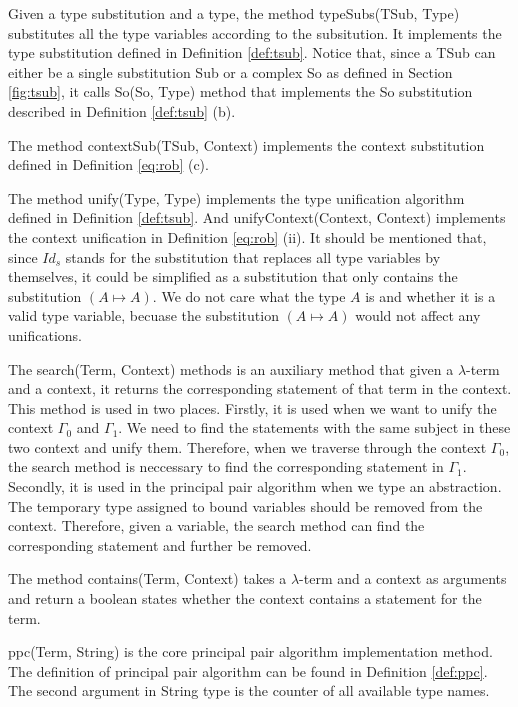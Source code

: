 Given a type substitution and a type, the method \textsf{typeSubs(TSub, Type)} substitutes all the type variables according to the subsitution. It implements the type substitution defined in Definition \ref{def:tsub}. Notice that, since a \textsf{TSub} can either be a single substitution \textsf{Sub} or a complex \textsf{So} as defined in Section \ref{fig:tsub}, it calls \textsf{So(So, Type)} method that implements the \textsf{So} substitution described in Definition \ref{def:tsub} (b). 

The method \textsf{contextSub(TSub, Context)} implements the context substitution defined in Definition \ref{eq:rob} (c). 

The method \textsf{unify(Type, Type)} implements the type unification algorithm defined in Definition \ref{def:tsub}. And \textsf{unifyContext(Context, Context)} implements the context unification in Definition \ref{eq:rob} (ii). It should be mentioned that, since $Id_s$ stands for the substitution that replaces all type variables by themselves, it could be simplified as a substitution that only contains the substitution $(A\mapsto A)$. We do not care what the type $A$ is and whether it is a valid type variable, becuase the substitution $(A\mapsto A)$ would not affect any unifications. 

The \textsf{search(Term, Context)} methods is an auxiliary method that given a $\lambda$-term and a context, it returns the corresponding statement of that term in the context. This method is used in two places. Firstly, it is used when we want to unify the context $\Gamma_0$ and $\Gamma_1$. We need to find the statements with the same subject in these two context and unify them. Therefore, when we traverse through the context $\Gamma_0$, the search method is neccessary to find the corresponding statement in $\Gamma_1$. Secondly, it is used in the principal pair algorithm when we type an abstraction. The temporary type assigned to bound variables should be removed from the context. Therefore, given a variable, the search method can find the corresponding statement and further be removed.  

The method \textsf{contains(Term, Context)} takes a $\lambda$-term and a context as arguments and return a boolean states whether the context contains a statement for the term.

\textsf{ppc(Term, String)} is the core principal pair algorithm implementation method. The definition of principal pair algorithm can be found in Definition \ref{def:ppc}. The second argument in \textsf{String} type is the counter of all available type names. 

